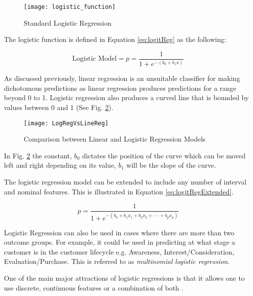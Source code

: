 \begin{figure}[H]
	\texttt{[image: logistic\_function]}
	\caption[Standard Logistic Regression]
	{Standard Logistic Regression}
	\label{fig:logistic_function}
\end{figure}

The logistic function is defined in Equation \ref{eq:logitReg} as the following: 

\begin{equation} \label{eq:logitReg}
	\text{Logistic Model}  =  p  =  \frac{1}{1 + e^{-(b_0 + b_1x)}}
\end{equation}

As discussed previously, linear regression is an unsuitable classifier for making dichotomous predictions as linear regression produces predictions for a range beyond 0 to 1. Logistic regression also produces a curved line that is bounded by values between 0 and 1 (See Fig. \ref{fig:LogRegVsLineReg}).

\begin{figure}[H]
	\texttt{[image: LogRegVsLineReg]}
	\caption{Comparison between Linear and Logistic Regression Models}
	\label{fig:LogRegVsLineReg}
\end{figure}

In Fig. \ref{fig:LogRegVsLineReg} the constant, $b_0$ dictates the position of the curve which can be moved left and right depending on its value, $b_1$ will be the slope of the curve. 

The logistic regression model can be extended to include any number of interval and nominal features. This is illustrated in Equation \ref{eq:logitRegExtended}.

\begin{equation} \label{eq:logitRegExtended}
	p  =  \frac{1}{1 + e^{-(b_0 + b_1x_1 + b_2x_2 +\cdot\cdot\cdot+ b_px_p )}}
\end{equation}

Logistic Regression can also be used in cases where there are more than two outcome groups. For example, it could be used in predicting at what stage a customer is in the customer lifecycle e.g. Awareness, Interest/Consideration, Evaluation/Purchase. This is referred to as \textit{multinomial logistic regression}.


One of the main major attractions of logistic regressions is that it allows one to use discrete, continuous features or a combination of both \citep{lee_application_2005}.

